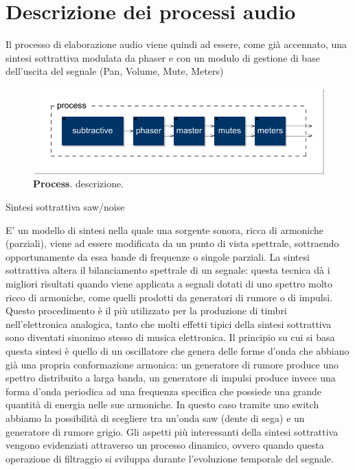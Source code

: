 \documentclass[
	a4paper,
	twocolumn
	]{article}
\begin{document}
\section*{Descrizione dei processi audio}

Il processo di elaborazione audio viene quindi ad essere, come già accennato,
una sintesi sottrattiva modulata da phaser e con un modulo di gestione di base
dell'uscita del segnale (Pan, Volume, Mute, Meters)

\begin{figure}[b]%
\begin{center}
\includegraphics[width=.47\textwidth]{img/process.pdf}
\caption{\textbf{Process}. descrizione.}
\label{process}
\end{center}
\end{figure}


Sintesi sottrattiva saw/noise

E’ un modello di sintesi nella quale una sorgente sonora, ricca di armoniche
(parziali), viene ad essere modificata da un punto di vista spettrale,
sottraendo opportunamente da essa bande di frequenze o singole parziali. La
sintesi sottrattiva altera il bilanciamento spettrale di un segnale: questa
tecnica dà i migliori risultati quando viene applicata a segnali dotati di uno
spettro molto ricco di armoniche, come quelli prodotti da generatori di rumore
o di impulsi. Questo procedimento è il più utilizzato per la produzione di
timbri nell'elettronica analogica, tanto che molti effetti tipici della sintesi
sottrattiva sono diventati sinonimo stesso di musica elettronica. Il principio
su cui si basa questa sintesi è quello di un oscillatore che genera delle forme
d'onda che abbiano già una propria conformazione armonica: un generatore di
rumore produce uno spettro distribuito a larga banda, un generatore di impulsi
produce invece una forma d’onda periodica ad una frequenza specifica che
possiede una grande quantità di energia nelle sue armoniche. In questo caso
tramite uno switch abbiamo la possibilità di scegliere tra un’onda saw (dente
di sega) e un generatore di rumore grigio.
Gli aspetti più interessanti della sintesi sottrattiva vengono evidenziati
attraverso un processo dinamico, ovvero quando questa operazione di filtraggio
si sviluppa durante l’evoluzione temporale del segnale.
\end{document}

